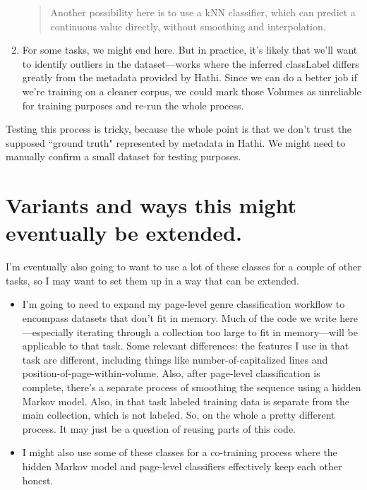 \documentclass[12pt]{article}
\begin{document}
\begin{enumerate}
\begin{quote}
Another possibility here is to use a kNN classifier, which can predict a continuous value directly, without smoothing and interpolation.
\end{quote}
\item For some tasks, we might end here. But in practice, it's likely that we'll want to identify outliers in the dataset---works where the inferred classLabel differs greatly from the metadata provided by Hathi. Since we can do a better job if we're training on a cleaner corpus, we could mark those Volumes as unreliable for training purposes and re-run the whole process.
\end{enumerate}

Testing this process is tricky, because the whole point is that we don't trust the supposed ``ground truth" represented by metadata in Hathi. We might need to manually confirm a small dataset for testing purposes.

\section{Variants and ways this might eventually be extended.}

I'm eventually also going to want to use a lot of these classes for a couple of other tasks, so I may want to set them up in a way that can be extended.

\begin{itemize}
\item I'm going to need to expand my page-level genre classification workflow to encompass datasets that don't fit in memory. Much of the code we write here---especially iterating through a collection too large to fit in memory---will be applicable to that task. Some relevant differences: the features I use in that task are different, including things like number-of-capitalized lines and position-of-page-within-volume. Also, after page-level classification is complete, there's a separate process of smoothing the sequence using a hidden Markov model. Also, in that task labeled training data is separate from the main collection, which is not labeled. So, on the whole a pretty different process. It may just be a question of reusing parts of this code.
\item I might also use some of these classes for a co-training process where the hidden Markov model and page-level classifiers effectively keep each other honest.
\end{itemize}
\end{document}

